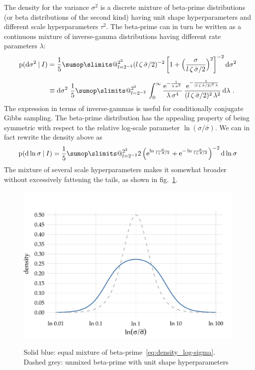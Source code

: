 \documentclass[\ifafour a4paper,12pt,\else a5paper,10pt,\fi%
onecolumn,oneside,article,%
british%
]{memoir}
\makeatletter
\theoremstyle{remark}
\theoremstyle{innote}
\def\sum{\DOTSI\sumop\slimits@}
\newcommand*{\e}{\ensuremath{\mathrm{e}}}
\newcommand*{\di}{\mathrm{d}}%
\newcommand*{\p}{\mathrm{p}}%
\renewcommand*{\|}[1][]{\nonscript\:#1\vert\nonscript\:\mathopen{}}
\newcommand*{\sect}{\S}%
\newcommand*{\fig}{fig.}%
\newcommand*{\sigmao}{\bar{\sigma}}
\makeatother
\begin{document}
\medskip

The density for the variance $\sigma^{2}$ is a discrete mixture of beta-prime distributions (or beta distributions of the second kind) \autocites[\sect\,25.7, 27.2]{johnsonetal1970b_r1995}{mcdonald1984} having unit shape hyperparameters and different scale hyperparameters $\tau^{2}$. The beta-prime can in turn be written as a continuous mixture of inverse-gamma distributions \autocites{dubey1970} having different rate parameters $\lambda$:
\begin{equation}
  \label{eq:density_sigma}
  \begin{split}
    \p(\di\sigma^{2}\|I) &=
    \frac{1}{5}\sum_{l=2^{-2}}^{2^{2}}
    (l\,\zeta\,\sigmao/2)^{-2}\,\biggl[1+\Bigl(\frac{\sigma}{l\,\zeta\,\sigmao/2}\Bigr)^{2}\biggr]^{-2}
    \,\di\sigma^{2}
  \\[2\jot]
  &\equiv
    \di\sigma^{2}\ 
    \frac{1}{5}\sum_{l=2^{-2}}^{2^{2}}\,
    \int_{0}^{\infty}
    \frac{\e^{-\frac{1}{\lambda\,\sigma^{2}}}}{
    \lambda\,\sigma^{4}
  }\,
    \frac{\e^{-\frac{1}{(l\,\zeta\,\sigmao/2)^{2}\,\lambda}}}{
    (l\,\zeta\,\sigmao/2)^{2}\,\lambda^{2}
  }\,\di\lambda \ .
\end{split}
\end{equation}
The expression in terms of inverse-gammas is useful for conditionally conjugate Gibbs sampling. The beta-prime distribution has the appealing property of being symmetric with respect to the relative log-scale parameter $\ln(\sigma/\sigmao)$. We can in fact rewrite the density above as
\begin{equation}
  \label{eq:density_log-sigma}
    \p(\di \ln\sigma\|I) =
    \frac{1}{5}\sum_{l=2^{-2}}^{2^{2}}
    2\,\Bigl(
    \e^{\ln\frac{\sigma}{l\,\zeta\,\sigmao/2}}
+    \e^{-\ln\frac{\sigma}{l\,\zeta\,\sigmao/2}}
    \Bigr)^{-2}\, \di\ln\sigma
\end{equation}
The mixture of several scale hyperparameters makes it somewhat broader without excessively fattening the tails, as shown in \fig~\ref{fig:betaprime}.
\begin{figure}
\centering\includegraphics[width=0.75\linewidth]{betaprime.pdf}\\
\caption{Solid blue: equal mixture of beta-prime~\eqref{eq:density_log-sigma}. Dashed grey: unmixed beta-prime with unit shape hyperparameters}\label{fig:betaprime}
\end{figure}
\end{document}
